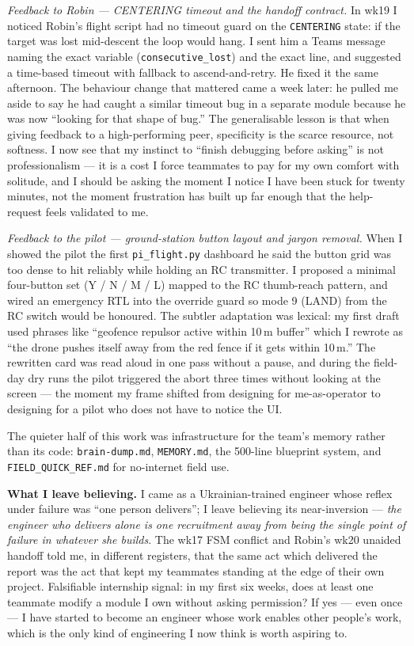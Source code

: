 \textit{Feedback to Robin --- CENTERING timeout and the handoff contract.} In wk19 I noticed Robin's flight script had no timeout guard on the \texttt{CENTERING} state: if the target was lost mid-descent the loop would hang. I sent him a Teams message naming the exact variable (\texttt{consecutive\_lost}) and the exact line, and suggested a time-based timeout with fallback to ascend-and-retry. He fixed it the same afternoon. The behaviour change that mattered came a week later: he pulled me aside to say he had caught a similar timeout bug in a separate module because he was now ``looking for that shape of bug.'' The generalisable lesson is that when giving feedback to a high-performing peer, specificity is the scarce resource, not softness. I now see that my instinct to ``finish debugging before asking'' is not professionalism --- it is a cost I force teammates to pay for my own comfort with solitude, and I should be asking the moment I notice I have been stuck for twenty minutes, not the moment frustration has built up far enough that the help-request feels validated to me.

\textit{Feedback to the pilot --- ground-station button layout and jargon removal.} When I showed the pilot the first \texttt{pi\_flight.py} dashboard he said the button grid was too dense to hit reliably while holding an RC transmitter. I proposed a minimal four-button set (Y / N / M / L) mapped to the RC thumb-reach pattern, and wired an emergency RTL into the override guard so mode 9 (LAND) from the RC switch would be honoured. The subtler adaptation was lexical: my first draft used phrases like ``geofence repulsor active within 10\,m buffer'' which I rewrote as ``the drone pushes itself away from the red fence if it gets within 10\,m.'' The rewritten card was read aloud in one pass without a pause, and during the field-day dry runs the pilot triggered the abort three times without looking at the screen --- the moment my frame shifted from designing for me-as-operator to designing for a pilot who does not have to notice the UI.

The quieter half of this work was infrastructure for the team's memory rather than its code: \texttt{brain-dump.md}, \texttt{MEMORY.md}, the 500-line blueprint system, and \texttt{FIELD\_QUICK\_REF.md} for no-internet field use.

\textbf{What I leave believing.} I came as a Ukrainian-trained engineer whose reflex under failure was ``one person delivers''; I leave believing its near-inversion --- \emph{the engineer who delivers alone is one recruitment away from being the single point of failure in whatever she builds}. The wk17 FSM conflict and Robin's wk20 unaided handoff told me, in different registers, that the same act which delivered the report was the act that kept my teammates standing at the edge of their own project. Falsifiable internship signal: in my first six weeks, does at least one teammate modify a module I own without asking permission? If yes --- even once --- I have started to become an engineer whose work enables other people's work, which is the only kind of engineering I now think is worth aspiring to.
